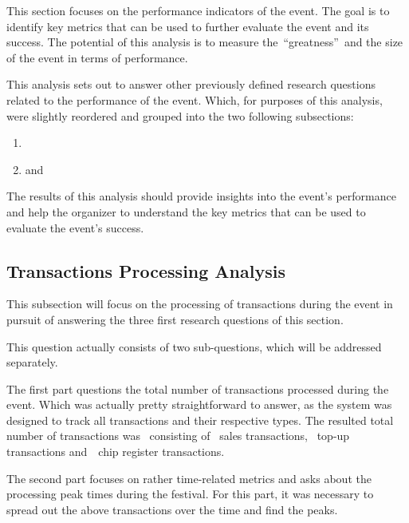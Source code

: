 This section focuses on the performance indicators of the event.
The goal is to identify key metrics that can be used to further evaluate the event and its success.
The potential of this analysis is to measure the~\enquote{greatness}~and the size of the event in terms of performance.

This analysis sets out to answer other previously defined research questions related to the performance of the event.
Which, for purposes of this analysis, were slightly reordered and grouped into the two following subsections:
\begin{enumerate}
	\item {}
	\item and~
\end{enumerate}

The results of this analysis should provide insights into the event's performance and help the organizer to understand the key metrics that can be used to evaluate the event's success.


\subsection{Transactions Processing Analysis}
\label{subsec:analysis-performance-indicators-transactions}

This subsection will focus on the processing of transactions during the event in pursuit of answering the three first research questions of this section.


This question actually consists of two sub-questions, which will be addressed separately.

The first part questions the total number of transactions processed during the event.
Which was actually pretty straightforward to answer, as the system was designed to track all transactions and their respective types.
The resulted total number of transactions was~ consisting of ~sales transactions, ~top-up transactions and~~chip register transactions.

The second part focuses on rather time-related metrics and asks about the processing peak times during the festival.
For this part, it was necessary to spread out the above transactions over the time and find the peaks.


